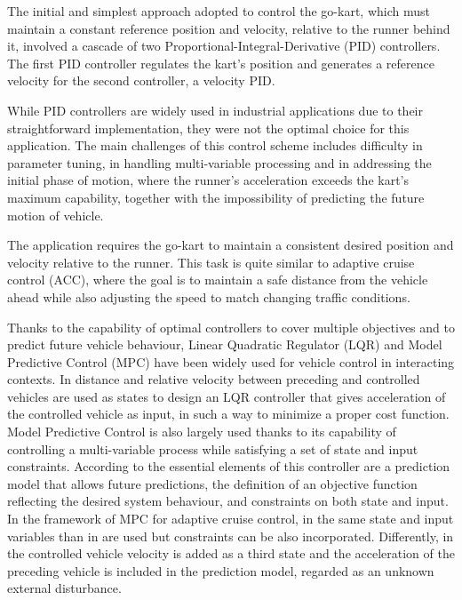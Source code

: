 \documentclass[a4paper,12pt,oneside]{book}
\begin{document}
\bigskip
The initial and simplest approach adopted to control the go-kart, which must maintain a constant reference position and velocity, relative to the runner behind it, involved a cascade of two Proportional-Integral-Derivative (PID) controllers.
The first PID controller regulates the kart's position and generates a reference velocity for the second controller, a velocity PID.

While PID controllers are widely used in industrial applications due to their straightforward implementation, they were not the optimal choice for this application.
The main challenges of this control scheme includes difficulty in parameter tuning, in handling multi-variable processing and in addressing the initial phase of motion, where the runner's acceleration exceeds the kart's maximum capability, together with the impossibility of predicting the future motion of vehicle. 

\bigskip
The application requires the go-kart to maintain a consistent desired position and velocity relative to the runner.
This task is quite similar to adaptive cruise control (ACC), where the goal is to maintain a safe distance from the vehicle ahead while also adjusting the speed to match changing traffic conditions.

\bigskip
Thanks to the capability of optimal controllers to cover multiple objectives and to predict future vehicle behaviour, Linear Quadratic Regulator (LQR) and Model Predictive Control (MPC) have been widely used for vehicle control in interacting contexts.
In \cite{LQR_acc} distance and relative velocity between preceding and controlled vehicles are used as states to design an LQR controller that gives acceleration of the controlled vehicle as input, in such a way to minimize a proper cost function.
Model Predictive Control is also largely used thanks to its capability of controlling a multi-variable process while satisfying a set of state and input constraints. According to \cite{MPC_basics} the essential elements of this controller are a prediction model that allows future predictions, the definition of an objective function reflecting the desired system behaviour, and constraints on both state and input. In the framework of MPC for adaptive cruise control, in \cite{MPC_acc_first} the same state and input variables than in \cite{LQR_acc} are used but constraints can be also incorporated. Differently, in \cite{MPC_acc_second} the controlled vehicle velocity is added as a third state and the acceleration of the preceding vehicle is included in the prediction model, regarded as an unknown external disturbance.
\end{document}
